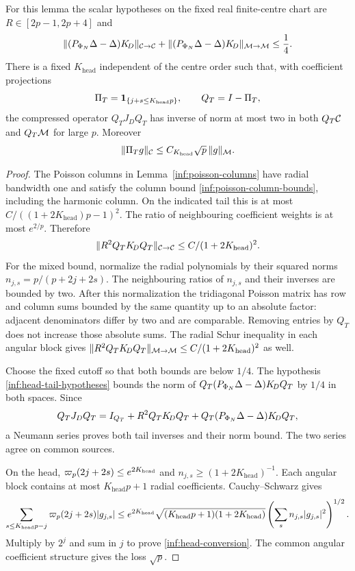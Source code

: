 \begin{lemma}
\label{inf:head-tail}
For this lemma the scalar hypotheses on the fixed real finite-centre
chart are $R\in[2p-1,2p+4]$ and
\begin{equation}\label{inf:head-tail-hypotheses}
 \lVert (P_{\Phi_N}\Delta-\Delta)K_{\!D}\rVert_{\mathcal C\to\mathcal C}
 +\lVert (P_{\Phi_N}\Delta-\Delta)K_{\!D}\rVert_{\mathcal M\to\mathcal M}
 \le\frac14.
\end{equation}
There is a fixed $K_{\mathrm{head}}$ independent of the centre order
such that, with coefficient projections
\[
 \Pi_T=\mathbf{1}_{\{j+s\le K_{\mathrm{head}}p\}},\qquad Q_T=I-\Pi_T,
\]
the compressed operator $Q_TJ_DQ_T$ has inverse of norm at most
two in both $Q_T\mathcal C$ and $Q_T\mathcal M$ for large $p$.
Moreover
\begin{equation}\label{inf:head-conversion}
 \lVert \Pi_Tg\rVert_\mathcal C\le C_{K_{\mathrm{head}}}\sqrt p\,
                                                   \lVert g\rVert_{\mathcal M}.
\end{equation}
\end{lemma}
\begin{proof}
The Poisson columns in Lemma~\ref{inf:poisson-columns} have radial
bandwidth one and satisfy the column bound
\eqref{inf:poisson-column-bounds}, including the harmonic column.
On the indicated tail this is at most
$C/((1+2K_{\mathrm{head}})p-1)^2$.
The ratio of neighbouring coefficient weights is at most $e^{2/p}$.
Therefore
\[
 \lVert R^2Q_TK_{\!D} Q_T\rVert_{\mathcal C\to\mathcal C}
 \le C/(1+2K_{\mathrm{head}})^2.
\]
For the mixed bound, normalize the radial polynomials by their
squared norms $n_{j,s}=p/(p+2j+2s)$.
The neighbouring ratios of $n_{j,s}$ and their inverses are
bounded by two. After this normalization the tridiagonal
Poisson matrix has row and column sums bounded by the same
quantity up to an absolute factor: adjacent denominators differ
by two and are comparable. Removing entries by $Q_T$ does not
increase those absolute sums. The radial Schur inequality in
each angular block gives
$\lVert R^2Q_TK_{\!D} Q_T\rVert_{\mathcal M\to\mathcal M}
\le C/(1+2K_{\mathrm{head}})^2$ as well.

Choose the fixed cutoff so that both bounds are below $1/4$.
The hypothesis \eqref{inf:head-tail-hypotheses} bounds the norm of
$Q_T(P_{\Phi_N}\Delta-\Delta)K_{\!D} Q_T$ by $1/4$ in both spaces.
Since
\[
 Q_TJ_DQ_T=I_{Q_T}+R^2Q_TK_{\!D} Q_T
                   +Q_T(P_{\Phi_N}\Delta-\Delta)K_{\!D} Q_T,
\]
a Neumann series proves both tail inverses and their norm bound.
The two series agree on common sources.

On the head, $\varpi_p(2j+2s)\le e^{2K_{\mathrm{head}}}$ and
$n_{j,s}\ge(1+2K_{\mathrm{head}})^{-1}$.
Each angular block contains at most $K_{\mathrm{head}}p+1$ radial
coefficients. Cauchy--Schwarz gives
\[
 \sum_{s\le K_{\mathrm{head}}p-j}\varpi_p(2j+2s)|g_{j,s}|
 \le e^{2K_{\mathrm{head}}}
 \sqrt{(K_{\mathrm{head}}p+1)(1+2K_{\mathrm{head}})}
 \left(\sum_s n_{j,s}|g_{j,s}|^2\right)^{1/2}.
\]
Multiply by $2^j$ and sum in $j$ to prove
\eqref{inf:head-conversion}. The common angular coefficient
structure gives the loss $\sqrt p$.
\end{proof}

